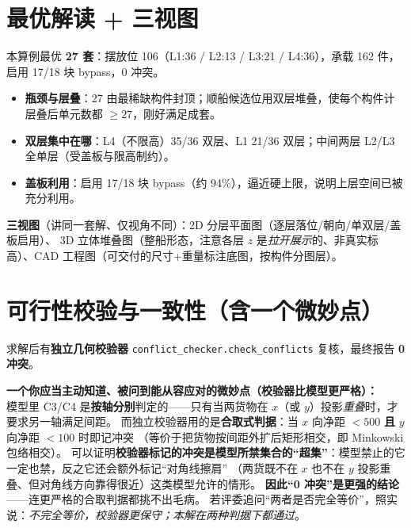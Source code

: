 \documentclass[11pt]{ctexart}
\newcommand{\code}[1]{\texttt{#1}}
\begin{document}
\section{最优解读 + 三视图}
本算例最优 \textbf{27 套}：摆放位 106（L1:36 / L2:13 / L3:21 / L4:36），承载 162 件，启用 17/18 块 bypass，0 冲突。
\begin{itemize}[leftmargin=1.8em,itemsep=1pt]
  \item \textbf{瓶颈与层叠}：27 由最稀缺构件封顶；顺船候选位用双层堆叠，使每个构件计层叠后单元数都 $\ge27$，刚好满足成套。
  \item \textbf{双层集中在哪}：L4（不限高）35/36 双层、L1 21/36 双层；中间两层 L2/L3 全单层（受盖板与限高制约）。
  \item \textbf{盖板利用}：启用 17/18 块 bypass（约 94\%），逼近硬上限，说明上层空间已被充分利用。
\end{itemize}
\textbf{三视图}（讲同一套解、仅视角不同）：2D 分层平面图（逐层落位/朝向/单双层/盖板启用）、
3D 立体堆叠图（整船形态，注意各层 $z$ 是\emph{拉开展示}的、非真实标高）、CAD 工程图（可交付的尺寸+重量标注底图，按构件分图层）。

\section{可行性校验与一致性（含一个微妙点）}
求解后有\textbf{独立几何校验器} \code{conflict\_checker.check\_conflicts} 复核，最终报告 \textbf{0 冲突}。
\begin{warn}
\textbf{一个你应当主动知道、被问到能从容应对的微妙点（校验器比模型更严格）：}\\
模型里 C3/C4 是\textbf{按轴分别}判定的——只有当两货物在 $x$（或 $y$）投影\emph{重叠}时，才要求另一轴满足间距。
而独立校验器用的是\textbf{合取式判据}：当 $x$ 向净距 $<500$ \textbf{且} $y$ 向净距 $<100$ 时即记冲突
（等价于把货物按间距外扩后矩形相交，即 Minkowski 包络相交）。
可以证明\textbf{校验器标记的冲突是模型所禁集合的“超集”}：模型禁止的它一定也禁，反之它还会额外标记“对角线擦肩”
（两货既不在 $x$ 也不在 $y$ 投影重叠、但对角线方向靠得很近）这类模型允许的情形。
\textbf{因此“0 冲突”是更强的结论}——连更严格的合取判据都挑不出毛病。
若评委追问“两者是否完全等价”，照实说：\emph{不完全等价，校验器更保守；本解在两种判据下都通过}。
\end{warn}

\end{document}
